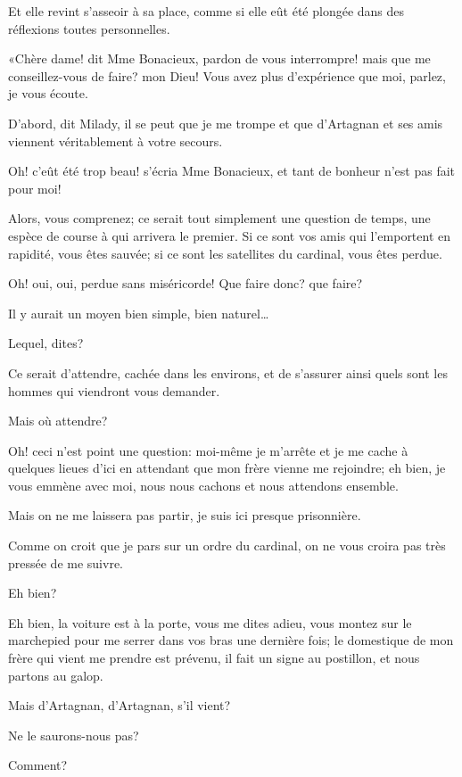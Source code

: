 Et elle revint s'asseoir à sa place, comme si elle eût été plongée dans des réflexions toutes personnelles. 

«Chère dame! dit Mme Bonacieux, pardon de vous interrompre! mais que me conseillez-vous de faire? mon Dieu! Vous avez plus d'expérience que moi, parlez, je vous écoute. 

\speak  D'abord, dit Milady, il se peut que je me trompe et que d'Artagnan et ses amis viennent véritablement à votre secours. 

\speak  Oh! c'eût été trop beau! s'écria Mme Bonacieux, et tant de bonheur n'est pas fait pour moi! 

\speak  Alors, vous comprenez; ce serait tout simplement une question de temps, une espèce de course à qui arrivera le premier. Si ce sont vos amis qui l'emportent en rapidité, vous êtes sauvée; si ce sont les satellites du cardinal, vous êtes perdue. 

\speak  Oh! oui, oui, perdue sans miséricorde! Que faire donc? que faire? 

\speak  Il y aurait un moyen bien simple, bien naturel\dots 

\speak  Lequel, dites? 

\speak  Ce serait d'attendre, cachée dans les environs, et de s'assurer ainsi quels sont les hommes qui viendront vous demander. 

\speak  Mais où attendre? 

\speak  Oh! ceci n'est point une question: moi-même je m'arrête et je me cache à quelques lieues d'ici en attendant que mon frère vienne me rejoindre; eh bien, je vous emmène avec moi, nous nous cachons et nous attendons ensemble. 

\speak  Mais on ne me laissera pas partir, je suis ici presque prisonnière. 

\speak  Comme on croit que je pars sur un ordre du cardinal, on ne vous croira pas très pressée de me suivre. 

\speak  Eh bien? 

\speak  Eh bien, la voiture est à la porte, vous me dites adieu, vous montez sur le marchepied pour me serrer dans vos bras une dernière fois; le domestique de mon frère qui vient me prendre est prévenu, il fait un signe au postillon, et nous partons au galop. 

\speak  Mais d'Artagnan, d'Artagnan, s'il vient? 

\speak  Ne le saurons-nous pas? 

\speak  Comment? 

